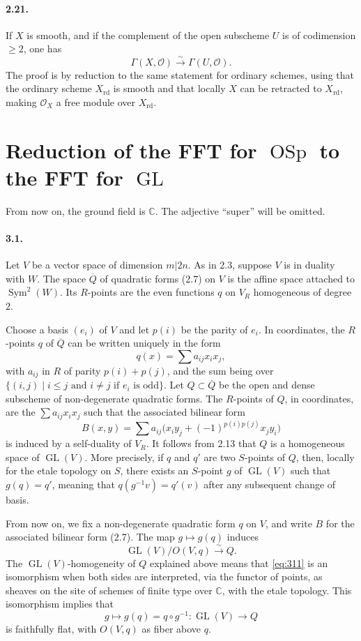 \documentclass[11pt]{article}
\newcommand{\C}{\mathbb C}
\newcommand{\GL}{\operatorname{GL}}
\newcommand{\OSp}{\operatorname{OSp}}
\newcommand{\Sym}{\operatorname{Sym}}
\newcommand{\rd}{\mathrm{rd}}
\newcommand{\calO}{\mathcal O}
\newcommand{\barQ}{\overline Q}
\begin{document}
\paragraph{2.21.}
If $X$ is smooth, and if the complement of the open subscheme $U$ is of codimension $\geq2$, one has
\[
\Gamma(X,\calO)\xrightarrow{\sim}\Gamma(U,\calO).
\]
The proof is by reduction to the same statement for ordinary schemes, using that the ordinary scheme $X_{\rd}$ is smooth and that locally $X$ can be retracted to $X_{\rd}$, making $\calO_X$ a free module over $X_{\rd}$.

\section{Reduction of the FFT for $\OSp$ to the FFT for $\GL$}

From now on, the ground field is $\C$. The adjective ``super'' will be omitted.

\paragraph{3.1.}
Let $V$ be a vector space of dimension $m|2n$. As in 2.3, suppose $V$ is in duality with $W$. The space $\barQ$ of quadratic forms (2.7) on $V$ is the affine space attached to $\Sym^2(W)$. Its $R$-points are the even functions $q$ on $V_R$ homogeneous of degree $2$.

Choose a basis $(e_i)$ of $V$ and let $p(i)$ be the parity of $e_i$. In coordinates, the $R$-points $q$ of $\barQ$ can be written uniquely in the form
\[
q(x)=\sum a_{ij}x_i x_j,
\]
with $a_{ij}$ in $R$ of parity $p(i)+p(j)$, and the sum being over $\{(i,j)\mid i\leq j\text{ and } i\ne j\text{ if }e_i\text{ is odd}\}$. Let $Q\subset\barQ$ be the open and dense subscheme of non-degenerate quadratic forms. The $R$-points of $Q$, in coordinates, are the $\sum a_{ij}x_i x_j$ such that the associated bilinear form
\[
B(x,y)=\sum a_{ij}\bigl(x_i y_j+(-1)^{p(i)p(j)}x_j y_i\bigr)
\]
is induced by a self-duality of $V_R$. It follows from 2.13 that $Q$ is a homogeneous space of $\GL(V)$. More precisely, if $q$ and $q'$ are two $S$-points of $Q$, then, locally for the etale topology on $S$, there exists an $S$-point $g$ of $\GL(V)$ such that $g(q)=q'$, meaning that $q(g^{-1}v)=q'(v)$ after any subsequent change of basis.

From now on, we fix a non-degenerate quadratic form $q$ on $V$, and write $B$ for the associated bilinear form (2.7). The map $g\mapsto g(q)$ induces
\begin{equation}
\label{eq:311}
\GL(V)/O(V,q)\xrightarrow{\sim}Q.
\end{equation}
The $\GL(V)$-homogeneity of $Q$ explained above means that \eqref{eq:311} is an isomorphism when both sides are interpreted, via the functor of points, as sheaves on the site of schemes of finite type over $\C$, with the etale topology. This isomorphism implies that
\[
g\longmapsto g(q)=q\circ g^{-1}:\GL(V)\longrightarrow Q
\]
is faithfully flat, with $O(V,q)$ as fiber above $q$.
\end{document}
